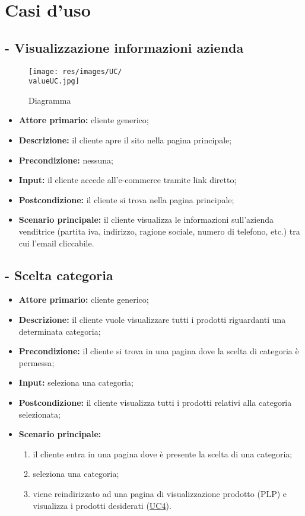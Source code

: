 \section{Casi d'uso}
\label{_casi_uso}
\resetCUC

\stepUserCase
\subsection{ - Visualizzazione informazioni azienda}
\begin{figure}[H]
    \centering
    \texttt{[image: res/images/UC/\\valueUC.jpg]}
    \caption{Diagramma }
\end{figure}
\begin{itemize}
    \item \textbf{Attore primario:} cliente generico;
    \item \textbf{Descrizione:} il cliente apre il sito nella pagina principale;
    \item \textbf{Precondizione:} nessuna;
    \item \textbf{Input:} il cliente accede all'e-commerce tramite link diretto;
    \item \textbf{Postcondizione:} il cliente si trova nella pagina principale;
    \item \textbf{Scenario principale:} il cliente visualizza le informazioni sull'azienda venditrice (partita iva, indirizzo, ragione sociale, numero di telefono, etc.) tra cui l'email cliccabile.
\end{itemize}


\stepUserCase
\subsection{ - Scelta categoria}
\begin{itemize}
    \item \textbf{Attore primario:} cliente generico;
    \item \textbf{Descrizione:} il cliente vuole visualizzare tutti i prodotti riguardanti una determinata categoria;
    \item \textbf{Precondizione:} il cliente si trova in una pagina dove la scelta di categoria è permessa;
    \item \textbf{Input:} seleziona una categoria;
    \item \textbf{Postcondizione:} il cliente visualizza tutti i prodotti relativi alla categoria selezionata;
    \item \textbf{Scenario principale:}
          \begin{enumerate}
              \item il cliente entra in una pagina dove è presente la scelta di una categoria;
              \item seleziona una categoria;
              \item viene reindirizzato ad una pagina di visualizzazione prodotto (PLP) e visualizza i prodotti desiderati (\hyperref[UC4]{UC4}).
          \end{enumerate}
\end{itemize}

